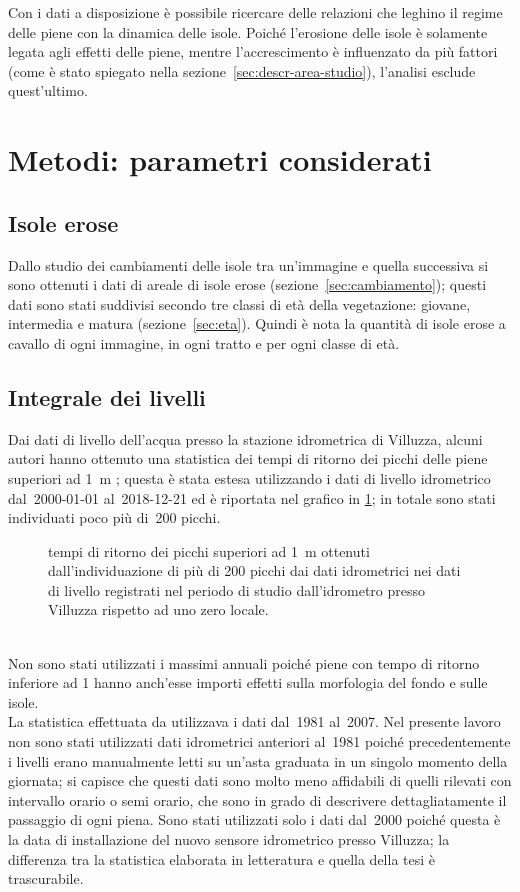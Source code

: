 Con i dati a disposizione è possibile ricercare delle relazioni che leghino il regime delle piene con la dinamica delle isole.
Poiché l'erosione delle isole è solamente legata agli effetti delle piene, mentre l'accrescimento è influenzato da più fattori (come è stato spiegato nella sezione~\ref{sec:descr-area-studio}), l'analisi esclude quest'ultimo.

\section{Metodi: parametri considerati}

\subsection{Isole erose}
Dallo studio dei cambiamenti delle isole tra un'immagine e quella successiva si sono ottenuti i dati di areale di isole erose (sezione~\ref{sec:cambiamento});
questi dati sono stati suddivisi secondo tre classi di età della vegetazione: giovane, intermedia e matura (sezione~\ref{sec:eta}).
Quindi è nota la quantità di isole erose a cavallo di ogni immagine, in ogni tratto e per ogni classe di età.

\subsection{Integrale dei livelli}
Dai dati di livello dell'acqua presso la stazione idrometrica di Villuzza, alcuni autori hanno ottenuto una statistica dei tempi di ritorno dei picchi delle piene superiori ad \SI{1}{\m} ; questa è stata estesa utilizzando i dati di livello idrometrico dal~2000-01-01 al~2018-12-21 ed è riportata nel grafico in \cref{graph:tr-picchi}; in totale sono stati individuati poco più di~200 picchi.
%
\begin{figure}
	\centering
	
	\caption[tempi di ritorno dei picchi superiori ad \SI{1}{\m}]{tempi di ritorno dei picchi superiori ad \SI{1}{\m} ottenuti dall'individuazione di più di 200 picchi dai dati idrometrici nei dati di livello registrati nel periodo di studio dall'idrometro presso Villuzza rispetto ad uno zero locale.}
	\label{graph:tr-picchi}
\end{figure}
%
\\
Non sono stati utilizzati i massimi annuali poiché piene con tempo di ritorno inferiore ad \SI{1}{\anno} hanno anch'esse importi effetti sulla morfologia del fondo e sulle isole.
\\
La statistica effettuata da  utilizzava i dati dal~1981 al~2007.
Nel presente lavoro non sono stati utilizzati dati idrometrici anteriori al~1981 poiché precedentemente i livelli erano manualmente letti su un'asta graduata in un singolo momento della giornata; si capisce che questi dati sono molto meno affidabili di quelli rilevati con intervallo orario o semi orario, che sono in grado di descrivere dettagliatamente il passaggio di ogni piena.
Sono stati utilizzati solo i dati dal~2000 poiché questa è la data di installazione del nuovo sensore idrometrico presso Villuzza; la differenza tra la statistica elaborata in letteratura e quella della tesi è trascurabile.


